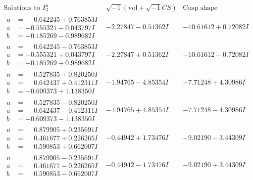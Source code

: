 \documentclass[1p]{elsarticle_modified}
\theoremstyle{definition}
\newcommand{\I}{\sqrt{-1}}
\begin{document}
$$\begin{array}{c|c|c}  
\text{Solutions to }I^u_{3}& \I (\text{vol} + \sqrt{-1}CS) & \text{Cusp shape}\\
 \hline 
\begin{aligned}
u &= \phantom{-}0.642245 + 0.763853 I \\
a &= -0.555321 - 0.043797 I \\
b &= -0.185269 - 0.989682 I\end{aligned}
 & -2.27847 - 0.51362 I & -10.61612 + 0.72082 I \\ \hline\begin{aligned}
u &= \phantom{-}0.642245 - 0.763853 I \\
a &= -0.555321 + 0.043797 I \\
b &= -0.185269 + 0.989682 I\end{aligned}
 & -2.27847 + 0.51362 I & -10.61612 - 0.72082 I \\ \hline\begin{aligned}
u &= \phantom{-}0.527835 + 0.820250 I \\
a &= \phantom{-}0.642437 + 0.412311 I \\
b &= -0.609373 + 1.138350 I\end{aligned}
 & -1.94765 - 4.85354 I & -7.71248 + 4.30986 I \\ \hline\begin{aligned}
u &= \phantom{-}0.527835 - 0.820250 I \\
a &= \phantom{-}0.642437 - 0.412311 I \\
b &= -0.609373 - 1.138350 I\end{aligned}
 & -1.94765 + 4.85354 I & -7.71248 - 4.30986 I \\ \hline\begin{aligned}
u &= \phantom{-}0.879905 + 0.235691 I \\
a &= \phantom{-}0.461677 + 0.226265 I \\
b &= \phantom{-}0.590853 + 0.662007 I\end{aligned}
 & -0.44942 + 1.73476 I & -9.02190 - 3.44309 I \\ \hline\begin{aligned}
u &= \phantom{-}0.879905 - 0.235691 I \\
a &= \phantom{-}0.461677 - 0.226265 I \\
b &= \phantom{-}0.590853 - 0.662007 I\end{aligned}
 & -0.44942 - 1.73476 I & -9.02190 + 3.44309 I \\ \hline\begin{aligned}

\end{aligned}
\end{array}$$
\end{document}
